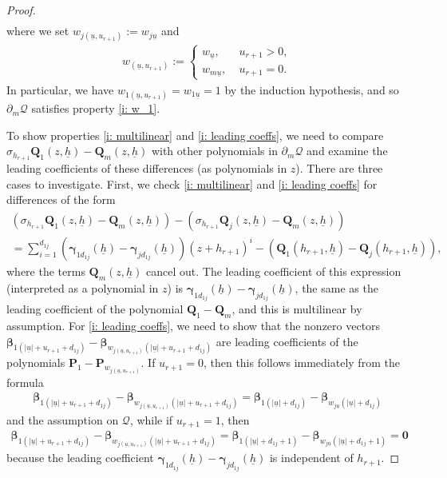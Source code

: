 \documentclass[11pt]{amsart}
\theoremstyle{definition}
\newcommand{\CQ}{{\mathcal Q}}
\newcommand{\bp}{{\mathbf{P}}}
\newcommand{\q}{{\mathbf{Q}}}
\newcommand{\bgamma}{{\boldsymbol{\gamma}}}
\newcommand{\bbeta}{{\boldsymbol{\beta}}}
\newcommand{\uh}{{\underline{h}}}
\newcommand{\uu}{{\underline{u}}}
\begin{document}
\begin{proof}
\begin{multline}
        \end{multline}
        where we set $w_{j(\uu, u_{r+1})} := w_{j\uu}$ and 
        \begin{align*}
            w_{(\uu, u_{r+1})} := \begin{cases} w_\uu,\; &u_{r+1}>0,\\
            w_{m\uu},\; &u_{r+1} = 0. 
            \end{cases}
        \end{align*}
      In particular, we have $w_{1(\uu, u_{r+1})} = w_{1\uu}= 1$ by the induction hypothesis, and so $\partial_m \CQ$ satisfies property \eqref{i: w_1}.
                
        
        
        To show properties \eqref{i: multilinear} and \eqref{i: leading coeffs},
        we need to compare $\sigma_{h_{r+1}}{\q}_1(z,\uh)-{\q}_m(z,\uh)$ with other polynomials in $\partial_m \CQ$ and examine the leading coefficients of these differences (as polynomials in $z$).
       There are three cases to investigate. First, we check \eqref{i: multilinear} and \eqref{i: leading coeffs} for differences of the form
        \begin{multline}\label{E: first case PET}
            (\sigma_{h_{r+1}}{\q}_1(z,\uh)-{\q}_m(z,\uh)) - (\sigma_{h_{r+1}}{\q}_j(z,\uh)-{\q}_m(z,\uh))\\
            = \sum_{i=1}^{d_{1j}}(\bgamma_{1d_{1j}}(\uh)-\bgamma_{jd_{1j}}(\uh))(z+h_{r+1})^i - (\q_1(h_{r+1},\uh) - \q_j(h_{r+1},\uh)),
        \end{multline}
        where the terms ${\q}_m(z,\uh)$ cancel out.
        The leading coefficient of this expression (interpreted as a polynomial in $z$) is $\bgamma_{1d_{1j}}(\uh)-\bgamma_{jd_{1j}}(\uh)$, the same as the leading coefficient of the polynomial $\q_1 - \q_m$, and this is multilinear by assumption.  For \eqref{i: leading coeffs}, we need to show that the nonzero vectors 
        $\bbeta_{1(|\uu|+ u_{r+1}+d_{1j})}-\bbeta_{w_{j(\uu, u_{r+1})}(|\uu|+u_{r+1}+d_{1j})}$ 
        are leading coefficients of the polynomials $\bp_1-\bp_{w_{j(\uu, u_{r+1})}}$. If $u_{r+1}=0$, then this follows immediately from the formula 
        \begin{align*}
            \bbeta_{1(|\uu|+ u_{r+1}+d_{1j})}-\bbeta_{w_{j(\uu, u_{r+1})}(|\uu|+u_{r+1}+d_{1j})} = \bbeta_{1(|\uu|+d_{1j})}-\bbeta_{w_{j\uu}(|\uu|+d_{1j})}
        \end{align*}
        and the assumption on $\CQ$, while if $u_{r+1} = 1$, then 
        \begin{align*}
            \bbeta_{1(|\uu|+ u_{r+1}+d_{1j})}-\bbeta_{w_{j(\uu, u_{r+1})}(|\uu|+u_{r+1}+d_{1j})} = \bbeta_{1(|\uu|+d_{1j}+1)}-\bbeta_{w_{j\uu}(|\uu|+d_{1j}+1)}=\mathbf{0}
        \end{align*}
        because the leading coefficient $\bgamma_{1d_{1j}}(\uh)-\bgamma_{jd_{1j}}(\uh)$ is independent of $h_{r+1}$.


\end{proof}
\end{document}
